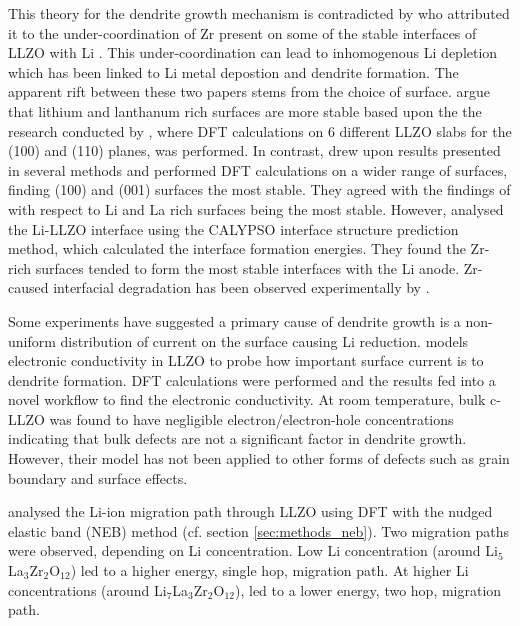 \documentclass[../main.tex]{subfiles}
\begin{document}
This theory for the dendrite growth mechanism is contradicted by \citeauthor{Gao2020} who attributed it to the under-coordination of Zr present on some of the stable interfaces of LLZO with Li .\cite{Gao2020} This under-coordination can lead to inhomogenous Li depletion which has been linked to Li metal depostion and dendrite formation.\cite{Tsai2016} The apparent rift between these two papers stems from the choice of surface. \citeauthor{Tian2018} argue that lithium and lanthanum rich surfaces are more stable based upon the the research conducted by \citeauthor{Thompson2017}, where DFT calculations on 6 different LLZO slabs for the (100) and (110) planes, was performed.\cite{Thompson2017} In contrast, \citeauthor{Gao2020} drew upon results presented in several methods\cite{Thompson2017, Canepa2018, Yu2016a} and performed DFT calculations on a wider range of surfaces, finding (100) and (001) surfaces the most stable. They agreed with the findings of \citeauthor{Tian2018} with respect to Li and La rich surfaces being the most stable. However, \citeauthor{Gao2020} analysed the Li-LLZO interface using the CALYPSO interface structure prediction method\cite{Wang2012, Gao2019}, which calculated the interface formation energies. They found the Zr-rich surfaces tended to form the most stable interfaces with the Li anode. Zr-caused interfacial degradation has been observed experimentally by \citeauthor{Zhu2019} \cite{Zhu2019}.

Some experiments have suggested a primary cause of dendrite growth is a non-uniform distribution of current on the surface causing Li reduction.\cite{Han2019_dendrite, Aguesse2017} \citeauthor{squires_2020} models electronic conductivity in LLZO to probe how important surface current is to dendrite formation.\cite{squires_2020} DFT calculations were performed and the results fed into a novel workflow to find the electronic conductivity. At room temperature, bulk c-LLZO was found to have negligible electron/electron-hole concentrations indicating that bulk defects are not a significant factor in dendrite growth. However, their model has not been applied to other forms of defects such as grain boundary and surface effects. 

\citeauthor{Xu2012} analysed the Li-ion migration path through LLZO using DFT with the nudged elastic band (NEB) method (cf. section \ref{sec:methods_neb}). Two migration paths were observed, depending on Li concentration.\cite{Xu2012} Low Li concentration (around Li$_5$La$_3$Zr$_2$O$_{12}$) led to a higher energy, single hop, migration path. At higher Li concentrations (around Li$_7$La$_3$Zr$_2$O$_{12}$), led to a lower energy, two hop, migration path.
\end{document}
